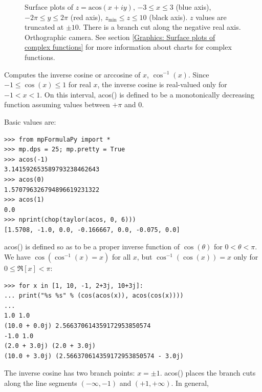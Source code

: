 \begin{figure}[ht]%
	\centering
	\qquad
	\caption[Complex Arccosine]{Surface plots of $z = \text{acos}(x + iy)$, $-3 \leq x \leq 3$ (blue axis), $-2 \pi \leq y \leq 2\pi$ (red axis), $z_{\text{min}} \leq z \leq 10$ (black axis). $z$ values are truncated at $\pm 10$. There is a branch cut along the negative real axis. Orthographic camera. See section \ref{Graphics: Surface plots of complex functions} for more information about charts for complex functions.} 
	\label{fig:Complex Arccosine}%
\end{figure}


Computes the inverse cosine or arccosine of $x$, $\cos^{-1}(x)$. Since $-1 \le \cos(x) \le 1$ for real $x$, the inverse cosine is real-valued only for $-1 < x < 1$. On this interval, acos() is defined to be a monotonically decreasing function assuming values between $+\pi$ and $0$.

\vpara
Basic values are:

\begin{lstlisting}
>>> from mpFormulaPy import *
>>> mp.dps = 25; mp.pretty = True
>>> acos(-1)
3.141592653589793238462643
>>> acos(0)
1.570796326794896619231322
>>> acos(1)
0.0
>>> nprint(chop(taylor(acos, 0, 6)))
[1.5708, -1.0, 0.0, -0.166667, 0.0, -0.075, 0.0]
\end{lstlisting}

acos() is defined so as to be a proper inverse function of $\cos(\theta)$ for $0 < \theta < \pi$. We have $\cos(\cos^{-1}(x)=x)$ for all $x$, but $\cos^{-1}(\cos(x))=x$ only for $0 \le \Re[x]<\pi$:

\begin{lstlisting}
>>> for x in [1, 10, -1, 2+3j, 10+3j]:
... print("%s %s" % (cos(acos(x)), acos(cos(x))))
...
1.0 1.0
(10.0 + 0.0j) 2.566370614359172953850574
-1.0 1.0
(2.0 + 3.0j) (2.0 + 3.0j)
(10.0 + 3.0j) (2.566370614359172953850574 - 3.0j)
\end{lstlisting}

The inverse cosine has two branch points: $x=\pm 1$. acos() places the branch cuts along the line segments $(-\infty,-1)$ and $(+1, +\infty)$. In general, 


